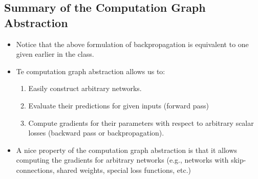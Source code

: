 \subsection{Summary of the Computation Graph Abstraction}
\begin{itemize}

\item Notice that the above formulation of backpropagation is equivalent to one given earlier in the class.

\item  Te computation graph abstraction allows us to:


\begin{enumerate}
 \item Easily construct arbitrary networks.
 \item Evaluate their predictions for given inputs (forward pass)
 
\item Compute gradients for their parameters with respect to arbitrary scalar losses (backward pass or backpropagation).
  
 \end{enumerate}
  
  
\item A nice property of the computation graph abstraction is that it allows computing the gradients for arbitrary networks (e.g., networks with skip-connections, shared weights, special loss functions, etc.)
 
  
 
  
\end{itemize}



